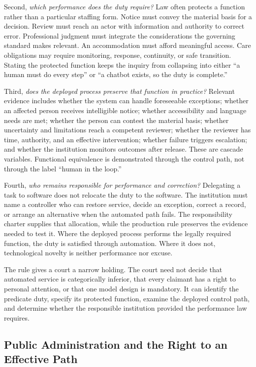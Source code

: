 Second, \emph{which performance does the duty require?} Law often protects a function rather than a particular staffing form. Notice must convey the material basis for a decision. Review must reach an actor with information and authority to correct error. Professional judgment must integrate the considerations the governing standard makes relevant. An accommodation must afford meaningful access. Care obligations may require monitoring, response, continuity, or safe transition. Stating the protected function keeps the inquiry from collapsing into either ``a human must do every step'' or ``a chatbot exists, so the duty is complete.''

Third, \emph{does the deployed process preserve that function in practice?} Relevant evidence includes whether the system can handle foreseeable exceptions; whether an affected person receives intelligible notice; whether accessibility and language needs are met; whether the person can contest the material basis; whether uncertainty and limitations reach a competent reviewer; whether the reviewer has time, authority, and an effective intervention; whether failure triggers escalation; and whether the institution monitors outcomes after release. These are cascade variables. Functional equivalence is demonstrated through the control path, not through the label ``human in the loop.''

Fourth, \emph{who remains responsible for performance and correction?} Delegating a task to software does not relocate the duty to the software. The institution must name a controller who can restore service, decide an exception, correct a record, or arrange an alternative when the automated path fails. The responsibility charter supplies that allocation, while the production rule preserves the evidence needed to test it. Where the deployed process performs the legally required function, the duty is satisfied through automation. Where it does not, technological novelty is neither performance nor excuse.

The rule gives a court a narrow holding. The court need not decide that automated service is categorically inferior, that every claimant has a right to personal attention, or that one model design is mandatory. It can identify the predicate duty, specify its protected function, examine the deployed control path, and determine whether the responsible institution provided the performance law requires.

\subsection{Public Administration and the Right to an Effective Path}

